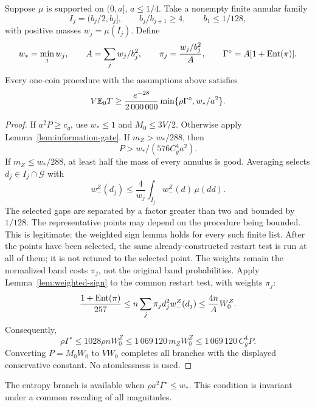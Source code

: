 \begin{proposition}
\label{prop:scaled-annular}
Suppose \(\mu\) is supported on \((0,a]\), \(a\le1/4\).
Take a nonempty finite annular family
\[
 I_j=(b_j/2,b_j],\qquad b_j/b_{j+1}\ge4,\qquad
 b_1\le1/128,
\]
with positive masses \(w_j=\mu(I_j)\).  Define
\[
 w_*=\min_jw_j,\qquad
 A=\sum_jw_j/b_j^2,\qquad
 \pi_j=\frac{w_j/b_j^2}{A},\qquad
 \Gamma^{\circ}=A[1+\operatorname{Ent}(\pi)].
\]
Every one-coin procedure with the assumptions above satisfies
\begin{equation}
 V\mathbb E_0T\ge
 \frac{e^{-28}}{2\,000\,000}
       \min\{\rho\Gamma^{\circ},w_*/a^2\}.
 \label{eq:cross-scaled-annular}
\end{equation}
\end{proposition}

\begin{proof}
If \(a^2P\ge c_g\), use \(w_*\le1\) and \(M_0\le3V/2\).
Otherwise apply Lemma~\ref{lem:information-gate}.
If \(m_Z>w_*/288\), then
\[
 P>w_*/(576C_g^4a^2).
\]
If \(m_Z\le w_*/288\), at least half the mass of every annulus is
good.  Averaging selects \(d_j\in I_j\cap\mathcal G\) with
\[
 w_-^Z(d_j)\le\frac4{w_j}\int_{I_j}w_-^Z(d)\,\mu(dd).
\]
The selected gaps are separated by a factor greater than two and
bounded by \(1/128\). The representative points may depend on the
procedure being bounded. This is legitimate: the weighted sign lemma
holds for every such finite list. After the points have been selected,
the same already-constructed restart test is run at all of them; it is
not retuned to the selected point. The weights remain the normalized
band costs $\pi_j$, not the original band probabilities.
Apply Lemma~\ref{lem:weighted-sign} to the common restart test,
with weights \(\pi_j\):
\[
 \frac{1+\operatorname{Ent}(\pi)}{257}
 \le n\sum_j\pi_jd_j^2w_-^Z(d_j)
 \le\frac{4n}{A}W_0^Z.
\]
Consequently,
\[
 \rho\Gamma^{\circ}
 \le1028\rho nW_0^Z
 \le1\,069\,120\,m_ZW_0^Z
 \le1\,069\,120\,C_g^4P.
\]
Converting \(P=M_0W_0\) to \(VW_0\) completes all branches with the
displayed conservative constant.  No atomlessness is used.
\end{proof}

The entropy branch is available when $\rho a^2\Gamma^{\circ}\le w_*$.
This condition is invariant under a common rescaling of all magnitudes.
